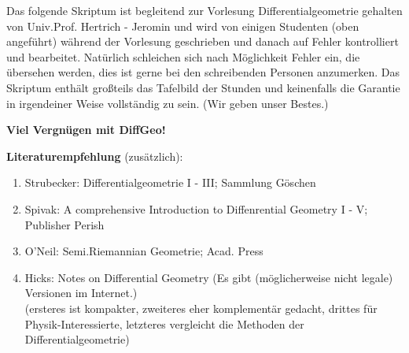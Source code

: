 Das folgende Skriptum ist begleitend zur Vorlesung Differentialgeometrie gehalten von Univ.Prof. Hertrich - Jeromin und wird von einigen Studenten (oben angeführt) während der Vorlesung geschrieben und danach auf Fehler kontrolliert und bearbeitet. Natürlich schleichen sich nach Möglichkeit Fehler ein, die übersehen werden, dies ist gerne bei den schreibenden Personen anzumerken.
Das Skriptum enthält großteils das Tafelbild der Stunden und keinenfalls die Garantie in irgendeiner Weise vollständig zu sein. (Wir geben unser Bestes.)

\textbf{Viel Vergnügen mit DiffGeo!}

\begin{remark}
	\textbf{Literaturempfehlung} (zusätzlich): \begin{enumerate}
		\item Strubecker: Differentialgeometrie I - III; Sammlung Göschen
		\item Spivak: A comprehensive Introduction to Diffenrential Geometry I - V; Publisher Perish
		\item O'Neil: Semi.Riemannian Geometrie; Acad. Press
		\item Hicks: Notes on Differential Geometry (Es gibt (möglicherweise nicht legale) Versionen im Internet.)\\
		(ersteres ist kompakter, zweiteres eher komplementär gedacht, drittes für Physik-Interessierte, letzteres vergleicht die Methoden der Differentialgeometrie)
	\end{enumerate}
\end{remark}